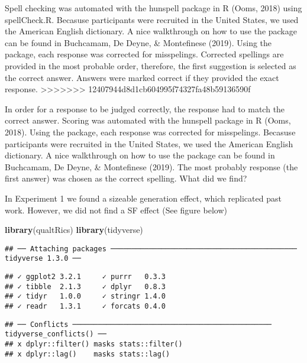 \documentclass[]{article}
\newenvironment{Shaded}{\begin{snugshade}}{\end{snugshade}}
\newcommand{\KeywordTok}[1]{\textcolor[rgb]{0.13,0.29,0.53}{\textbf{#1}}}
\newcommand{\NormalTok}[1]{#1}
\begin{document}
Spell checking was automated with the hunspell package in R (Ooms, 2018)
using spellCheck.R. Becasuse participants were recruited in the United
States, we used the American English dictionary. A nice walkthrough on
how to use the package can be found in Buchcamam, De Deyne, \&
Montefinese (2019). Using the package, each response was corrected for
misspelings. Corrected spellings are provided in the most probable
order, therefore, the first suggestion is selected as the correct
answer. Answers were marked correct if they provided the exact response.
\textgreater{}\textgreater{}\textgreater{}\textgreater{}\textgreater{}\textgreater{}\textgreater{}
12407944d8d1cb604995f74327fa48b59136590f

In order for a response to be judged correctly, the response had to
match the correct answer. Scoring was automated with the hunspell
package in R (Ooms, 2018). Using the package, each response was
corrected for misspelings. Becasuse participants were recruited in the
United States, we used the American English dictionary. A nice
walkthrough on how to use the package can be found in Buchcamam, De
Deyne, \& Montefinese (2019). The most probably response (the first
answer) was chosen as the correct spelling. What did we find?

In Experiment 1 we found a sizeable generation effect, which replicated
past work. However, we did not find a SF effect (See figure below)

\begin{Shaded}
\begin{Highlighting}[]
\KeywordTok{library}\NormalTok{(qualtRics)}
\KeywordTok{library}\NormalTok{(tidyverse)}
\end{Highlighting}
\end{Shaded}

\begin{verbatim}
## ── Attaching packages ──────────────────────────────────────────── tidyverse 1.3.0 ──
\end{verbatim}

\begin{verbatim}
## ✓ ggplot2 3.2.1     ✓ purrr   0.3.3
## ✓ tibble  2.1.3     ✓ dplyr   0.8.3
## ✓ tidyr   1.0.0     ✓ stringr 1.4.0
## ✓ readr   1.3.1     ✓ forcats 0.4.0
\end{verbatim}

\begin{verbatim}
## ── Conflicts ─────────────────────────────────────────────── tidyverse_conflicts() ──
## x dplyr::filter() masks stats::filter()
## x dplyr::lag()    masks stats::lag()
\end{verbatim}
\end{document}
